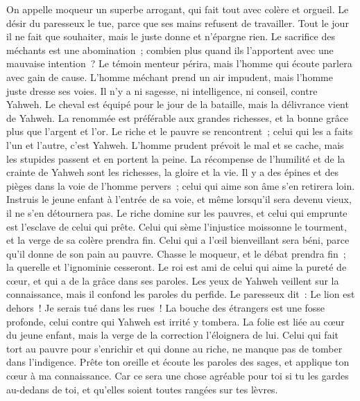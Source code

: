 \begin{multicols}{2}
On appelle moqueur un superbe arrogant, qui fait tout avec colère et orgueil.
Le désir du paresseux le tue, parce que ses mains refusent de travailler.
Tout le jour il ne fait que souhaiter, mais le juste donne et n'épargne rien.
Le sacrifice des méchants est une abomination~; combien plus quand ils l'apportent avec une mauvaise intention~?
Le témoin menteur périra, mais l'homme qui écoute parlera avec gain de cause.
L'homme méchant prend un air impudent, mais l'homme juste dresse ses voies.
Il n'y a ni sagesse, ni intelligence, ni conseil, contre Yahweh.
Le cheval est équipé pour le jour de la bataille, mais la délivrance vient de Yahweh.
\VerseOne{}La renommée est préférable aux grandes richesses, et la bonne grâce plus que l'argent et l'or.
Le riche et le pauvre se rencontrent~; celui qui les a faits l'un et l'autre, c'est Yahweh.
L'homme prudent prévoit le mal et se cache, mais les stupides passent et en portent la peine.
La récompense de l'humilité et de la crainte de Yahweh sont les richesses, la gloire et la vie.
Il y a des épines et des pièges dans la voie de l'homme pervers~; celui qui aime son âme s'en retirera loin.
Instruis le jeune enfant à l'entrée de sa voie, et même lorsqu'il sera devenu vieux, il ne s'en détournera pas.
Le riche domine sur les pauvres, et celui qui emprunte est l'esclave de celui qui prête.
Celui qui sème l'injustice moissonne le tourment, et la verge de sa colère prendra fin.
Celui qui a l'œil bienveillant sera béni, parce qu'il donne de son pain au pauvre.
Chasse le moqueur, et le débat prendra fin~; la querelle et l'ignominie cesseront.
Le roi est ami de celui qui aime la pureté de cœur, et qui a de la grâce dans ses paroles.
Les yeux de Yahweh veillent sur la connaissance, mais il confond les paroles du perfide.
Le paresseux dit~: Le lion est dehors~! Je serais tué dans les rues~!
La bouche des étrangers est une fosse profonde, celui contre qui Yahweh est irrité y tombera.
La folie est liée au cœur du jeune enfant, mais la verge de la correction l'éloignera de lui.
Celui qui fait tort au pauvre pour s'enrichir et qui donne au riche, ne manque pas de tomber dans l'indigence.
Prête ton oreille et écoute les paroles des sages, et applique ton cœur à ma connaissance.
Car ce sera une chose agréable pour toi si tu les gardes au-dedans de toi, et qu'elles soient toutes rangées sur tes lèvres.

\end{multicols}
